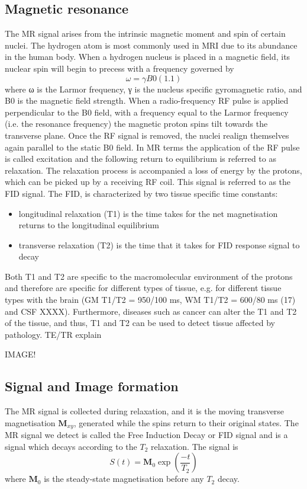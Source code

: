 \subsection*{Magnetic resonance}
The MR signal arises from the intrinsic magnetic moment and spin of certain nuclei. The hydrogen atom is most commonly used in MRI due to its abundance in the
human body. When a hydrogen nucleus is placed in a magnetic field, its nuclear spin will begin to precess with a frequency governed by
$$
ω =γB0 (1.1) 
$$
where ω is the Larmor frequency, γ is the nucleus specific gyromagnetic ratio, and B0 is the magnetic field strength. When a radio-frequency \gls{RF} pulse is applied perpendicular to the B0 field, with a frequency equal to the Larmor frequency (i.e. the resonance frequency) the magnetic proton spins tilt towards the transverse plane. Once the RF signal is removed, the nuclei realign themselves again parallel to the static B0 field. In MR terms the application of the \gls{RF} pulse is called excitation and the following return to equilibrium is referred to as relaxation. The relaxation process is accompanied a loss of energy by the protons, which can be picked up by a receiving RF coil. This signal is referred to as the \gls{FID} signal. The \gls{FID}, is characterized by two tissue specific time constants:  
\begin{itemize}
	\item longitudinal relaxation (T1) is the time takes for the net magnetisation returns to the longitudinal equilibrium
	\item transverse relaxation (T2) is the time that it takes for FID response signal to decay
\end{itemize}
Both T1 and T2 are specific to the macromolecular environment of the protons and therefore are specific for different types of tissue, e.g. for different tissue types with the brain (GM T1/T2 = 950/100 ms, WM T1/T2 = 600/80 ms (17) and CSF XXXX). Furthermore, diseases such as cancer can alter the T1 and T2 of the tissue, and thus, T1 and T2 can be used to detect tissue affected by pathology. TE/TR explain


IMAGE!
\subsection*{Signal and Image formation}
The MR signal is collected during relaxation, and it is the moving transverse magnetisation $\textbf{M}_{xy}$, generated while the spins return to their original states. The MR signal we detect is called the Free Induction Decay or FID signal and is a signal which decays according to the $T_{2}$ relaxation. The signal is
\begin{equation}
S(t)= \textbf{M}_{0}\exp(\frac{-t}{T_{2}})
\label{TET2}
\end{equation}
where $\textbf{M}_{0}$ is the steady-state magnetisation before any $T_{2}$ decay.

